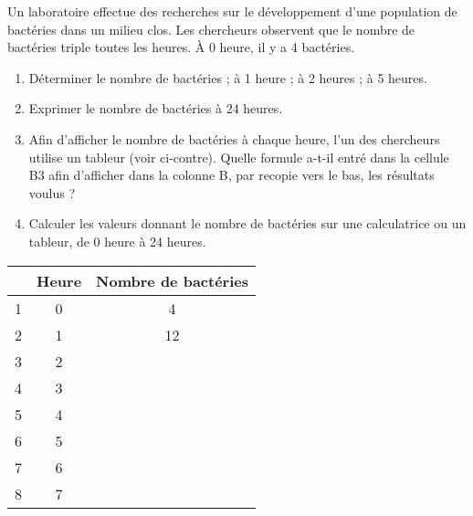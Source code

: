 
\begin{minipage}{0.59 \linewidth}
Un laboratoire effectue des recherches sur le développement d’une population de bactéries dans un milieu clos. Les chercheurs observent que le nombre de bactéries triple toutes les heures. À 0 heure, il y a 4 bactéries.
\begin{enumerate}
\item Déterminer le nombre de bactéries ; à 1 heure ; à 2 heures ; à 5 heures.
\item Exprimer le nombre de bactéries à 24 heures.
\item Afin d'afficher le nombre de bactéries à chaque heure, l'un des chercheurs utilise un tableur (voir ci-contre). Quelle formule a-t-il entré dans la cellule B3 afin d'afficher dans la colonne B, par recopie vers le bas, les résultats voulus ?
\item  Calculer les valeurs donnant le nombre de bactéries sur une calculatrice ou un tableur, de 0 heure à 24 heures.
\end{enumerate}
\end{minipage}
\hfill
\begin{minipage}{0.39 \linewidth}

\begin{tabular}{|c|c|c|}
\hline 
\cellcolor{gray} & \cellcolor{gray}Heure & \cellcolor{gray}Nombre de bactéries\\ 
\hline 
\cellcolor{gray} 1& 0  &4\\ 
\hline 
\cellcolor{gray}2 & 1  &12\\ 
\hline 
\cellcolor{gray}3 & 2  &\\ 
\hline 
\cellcolor{gray}4 & 3  &\\ 
\hline 
\cellcolor{gray}5 & 4  &\\ 
\hline 
\cellcolor{gray}6 & 5  &\\ 
\hline 
\cellcolor{gray}7 & 6  &\\ 
\hline 
\cellcolor{gray}8 & 7  &\\ 
\hline 

\end{tabular} 

\end{minipage}